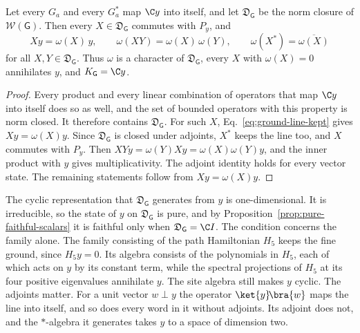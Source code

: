 \begin{proposition}
\label{prop:ground-keeping-family}
Let every $G_a$ and every $G_a^*$ map $\C y$ into itself, and let $\mathfrak D_{\mathsf G}$ be the norm closure of $\mathcal W(\mathsf G)$. Then every $X\in\mathfrak D_{\mathsf G}$ commutes with $P_y$, and
\begin{equation}
 Xy=\omega(X)\,y,\qquad \omega(XY)=\omega(X)\,\omega(Y),\qquad \omega(X^*)=\overline{\omega(X)}
 \label{eq:ground-character}
\end{equation}
for all $X,Y\in\mathfrak D_{\mathsf G}$. Thus $\omega$ is a character of $\mathfrak D_{\mathsf G}$, every $X$ with $\omega(X)=0$ annihilates $y$, and $K_{\mathsf G}=\C y$.
\end{proposition}
\begin{proof}
Every product and every linear combination of operators that map $\C y$ into itself does so as well, and the set of bounded operators with this property is norm closed. It therefore contains $\mathfrak D_{\mathsf G}$. For such $X$, Eq.~\eqref{eq:ground-line-kept} gives $Xy=\omega(X)y$. Since $\mathfrak D_{\mathsf G}$ is closed under adjoints, $X^*$ keeps the line too, and $X$ commutes with $P_y$. Then $XYy=\omega(Y)Xy=\omega(X)\omega(Y)y$, and the inner product with $y$ gives multiplicativity. The adjoint identity holds for every vector state. The remaining statements follow from $Xy=\omega(X)y$.
\end{proof}

The cyclic representation that $\mathfrak D_{\mathsf G}$ generates from $y$ is one-dimensional. It is irreducible, so the state of $y$ on $\mathfrak D_{\mathsf G}$ is pure, and by Proposition~\ref{prop:pure-faithful-scalars} it is faithful only when $\mathfrak D_{\mathsf G}=\C I$. The condition concerns the family alone. The family consisting of the path Hamiltonian $H_5$ keeps the fine ground, since $H_5y=0$. Its algebra consists of the polynomials in $H_5$, each of which acts on $y$ by its constant term, while the spectral projections of $H_5$ at its four positive eigenvalues annihilate $y$. The site algebra still makes $y$ cyclic. The adjoints matter. For a unit vector $w\perp y$ the operator $\ket{y}\!\bra{w}$ maps the line into itself, and so does every word in it without adjoints. Its adjoint does not, and the $*$-algebra it generates takes $y$ to a space of dimension two.
